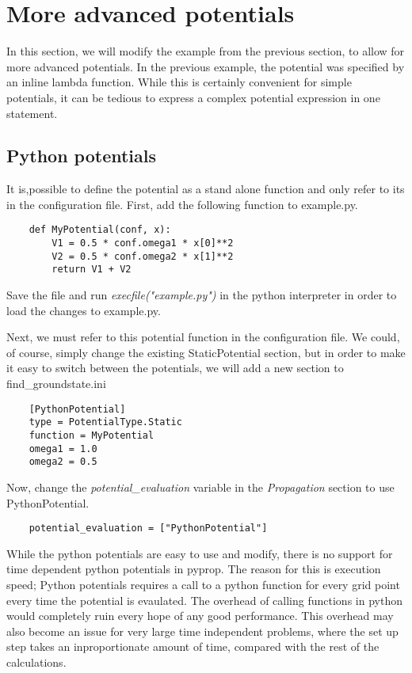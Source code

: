 \section{More advanced potentials}
In this section, we will modify the example from the previous section, to allow for more advanced 
potentials. In the previous example, the potential was specified by an inline lambda function. While
this is certainly convenient for simple potentials, it can be tedious to express a complex potential 
expression in one statement. 

\subsection{Python potentials}
It is,possible to define the potential as a stand alone function 
and only refer to its in the configuration file. First, add the following function to example.py.
\begin{verbatim}
	def MyPotential(conf, x):
	    V1 = 0.5 * conf.omega1 * x[0]**2
	    V2 = 0.5 * conf.omega2 * x[1]**2
	    return V1 + V2
\end{verbatim}
Save the file and run \textit{execfile("example.py")} in the python interpreter in order to load the 
changes to example.py.

Next, we must refer to this potential function in the configuration file. We could, of course, 
simply change the existing StaticPotential section, but in order to make it easy to switch between
the potentials, we will add a new section to find\_groundstate.ini
\begin{verbatim}
	[PythonPotential]
	type = PotentialType.Static
	function = MyPotential
	omega1 = 1.0
	omega2 = 0.5
\end{verbatim}
Now, change the \textit{potential\_evaluation} variable in the \textit{Propagation} section to use PythonPotential.
\begin{verbatim}
	potential_evaluation = ["PythonPotential"]
\end{verbatim}

While the python potentials are easy to use and modify, there is no support for time dependent python potentials 
in pyprop. The reason for this is execution speed; Python potentials requires a call to a python function for every
grid point every time the potential is evaulated. The overhead of calling functions in python would completely ruin
every hope of any good performance. This overhead may also become an issue for very large time independent problems,
where the set up step takes an inproportionate amount of time, compared with the rest of the calculations.

